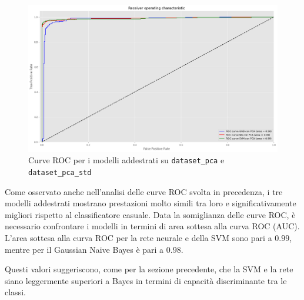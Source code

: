 \begin{figure}[!ht]
    \centering
    \includegraphics[width=\textwidth]{img/ris/roc_curve_pca.png}
    \caption{Curve ROC per i modelli addestrati su \texttt{dataset\_pca} e \texttt{dataset\_pca\_std}}
    \label{fig:roc_curve_pca}
\end{figure}

Come osservato anche nell'analisi delle curve ROC svolta in precedenza, i tre
modelli addestrati mostrano prestazioni molto simili tra loro e significativamente
migliori rispetto al classificatore casuale. Data la somiglianza delle curve ROC,
è necessario confrontare i modelli in termini di area sottesa alla curva ROC (AUC).
L'area sottesa alla curva ROC per la rete neurale e della SVM sono pari a $0.99$,
mentre per il Gaussian Naive Bayes è pari a $0.98$.

Questi valori suggeriscono, come per la sezione precedente, che la SVM e la rete
siano leggermente superiori a Bayes in termini di capacità discriminante tra le
classi.
